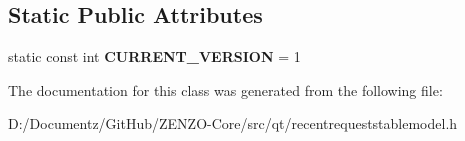 \subsection*{Static Public Attributes}
\begin{DoxyCompactItemize}
\item 
\mbox{\label{class_recent_request_entry_a1913e689444379d7a526e1680f7a1017}} 
static const int {\bfseries C\+U\+R\+R\+E\+N\+T\+\_\+\+V\+E\+R\+S\+I\+ON} = 1
\end{DoxyCompactItemize}


The documentation for this class was generated from the following file\+:\begin{DoxyCompactItemize}
\item 
D\+:/\+Documentz/\+Git\+Hub/\+Z\+E\+N\+Z\+O-\/\+Core/src/qt/recentrequeststablemodel.\+h\end{DoxyCompactItemize}
